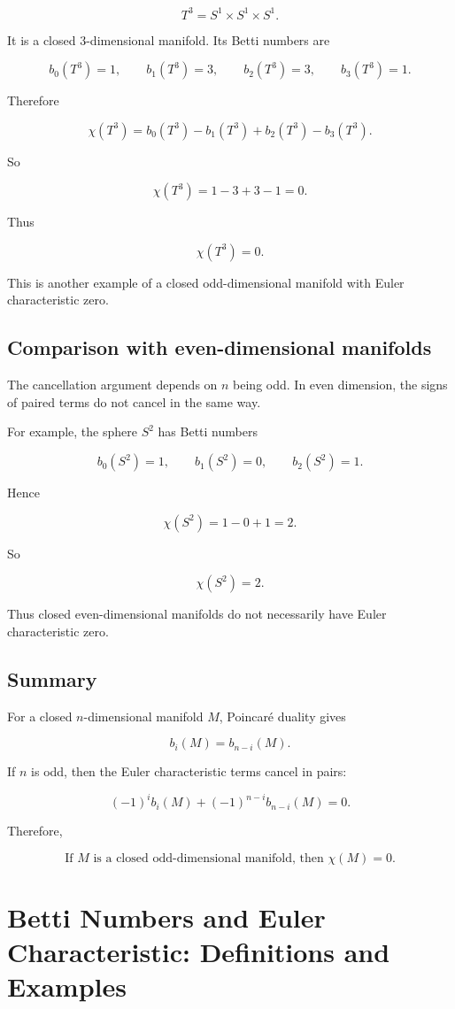 \documentclass[12pt,a4paper]{article}
\theoremstyle{notespace}
\begin{document}
\[
T^3=S^1 \times S^1 \times S^1.
\]

It is a closed $3$-dimensional manifold. Its Betti numbers are

\[
b_0(T^3)=1, \qquad
b_1(T^3)=3, \qquad
b_2(T^3)=3, \qquad
b_3(T^3)=1.
\]

Therefore

\[
\chi(T^3)
=
b_0(T^3)-b_1(T^3)+b_2(T^3)-b_3(T^3).
\]

So

\[
\chi(T^3)
=
1-3+3-1
=
0.
\]

Thus

\[
\boxed{\chi(T^3)=0.}
\]

This is another example of a closed odd-dimensional manifold with Euler
characteristic zero.

\subsection{Comparison with even-dimensional manifolds}

The cancellation argument depends on $n$ being odd. In even dimension, the signs
of paired terms do not cancel in the same way.

For example, the sphere $S^2$ has Betti numbers

\[
b_0(S^2)=1, \qquad b_1(S^2)=0, \qquad b_2(S^2)=1.
\]

Hence

\[
\chi(S^2)
=
1-0+1
=
2.
\]

So

\[
\boxed{\chi(S^2)=2.}
\]

Thus closed even-dimensional manifolds do not necessarily have Euler
characteristic zero.

\subsection{Summary}

For a closed $n$-dimensional manifold $M$, Poincaré duality gives

\[
b_i(M)=b_{n-i}(M).
\]

If $n$ is odd, then the Euler characteristic terms cancel in pairs:

\[
(-1)^i b_i(M)
+
(-1)^{n-i} b_{n-i}(M)
=
0.
\]

Therefore,

\[
\boxed{\text{If $M$ is a closed odd-dimensional manifold, then } \chi(M)=0.}
\]

\section{Betti Numbers and Euler Characteristic: Definitions and Examples}
\end{document}
